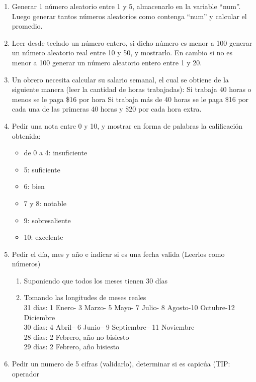 \begin{enumerate}[resume]
   \item Generar 1 número aleatorio entre 1 y 5, almacenarlo en la variable “num”. Luego
generar tantos números aleatorios como contenga “num” y calcular el promedio.

   \item Leer desde teclado un número entero, si dicho número es menor a 100 generar un
 número aleatorio real entre 10 y 50, y mostrarlo. En cambio si no es menor a
 100 generar un número aleatorio entero entre 1 y 20.

   \item Un obrero necesita calcular su salario semanal, el cual se obtiene de la
   siguiente manera (leer la cantidad de horas trabajadas): Si trabaja 40 horas
   o menos se le paga \$16 por hora Si trabaja más de 40 horas se le paga \$16
   por cada una de las primeras 40 horas y \$20 por cada hora extra.

  \item Pedir una nota entre 0 y 10, y mostrar en forma de palabras la
    calificación obtenida:
    \begin{itemize}
      \item de 0 a 4: insuficiente
      \item 5: suficiente
      \item 6: bien
      \item 7 y 8: notable
      \item 9: sobresaliente
      \item 10: excelente
    \end{itemize}

  \item Pedir el día, mes y año e indicar si es una fecha valida (Leerlos como
    números)
    \begin{enumerate}
      \item Suponiendo que todos los meses tienen 30 días
      \item Tomando las longitudes de meses reales\\
          31 días: 1 Enero- 3 Marzo- 5 Mayo- 7 Julio- 8 Agosto-10 Octubre-12 Diciembre\\
          30 días: 4 Abril– 6 Junio– 9 Septiembre– 11 Noviembre\\
          28 días: 2 Febrero, año no bisiesto\\
          29 días: 2 Febrero, año bisiesto
      \end{enumerate}

  \item Pedir un numero de 5 cifras (validarlo), determinar si es capicúa
    (TIP: operador %


\end{enumerate}
